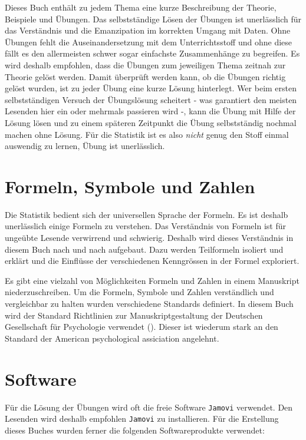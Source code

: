 \documentclass[
]{book}
\theoremstyle{definition}
\theoremstyle{definition}
\theoremstyle{definition}
\theoremstyle{definition}
\theoremstyle{remark}
\begin{document}
Dieses Buch enthält zu jedem Thema eine kurze Beschreibung der Theorie, Beispiele und Übungen. Das selbstständige Lösen der Übungen ist unerlässlich für das Verständnis und die Emanzipation im korrekten Umgang mit Daten. Ohne Übungen fehlt die Auseinandersetzung mit dem Unterrichtsstoff und ohne diese fällt es den allermeisten schwer sogar einfachste Zusammenhänge zu begreifen. Es wird deshalb empfohlen, dass die Übungen zum jeweiligen Thema zeitnah zur Theorie gelöst werden. Damit überprüft werden kann, ob die Übungen richtig gelöst wurden, ist zu jeder Übung eine kurze Lösung hinterlegt. Wer beim ersten selbstständigen Versuch der Übungslösung scheitert - was garantiert den meisten Lesenden hier ein oder mehrmals passieren wird -, kann die Übung mit Hilfe der Lösung lösen und zu einem späteren Zeitpunkt die Übung selbstständig nochmal machen ohne Lösung. Für die Statistik ist es also \emph{nicht} genug den Stoff einmal auswendig zu lernen, Übung ist unerlässlich.

\section{Formeln, Symbole und Zahlen}\label{formeln}

Die Statistik bedient sich der universellen Sprache der Formeln. Es ist deshalb unerlässlich einige Formeln zu verstehen. Das Verständnis von Formeln ist für ungeübte Lesende verwirrend und schwierig. Deshalb wird dieses Verständnis in diesem Buch nach und nach aufgebaut. Dazu werden Teilformeln isoliert und erklärt und die Einflüsse der verschiedenen Kenngrössen in der Formel exploriert.

Es gibt eine vielzahl von Möglichkeiten Formeln und Zahlen in einem Manuskript niederzuschreiben. Um die Formeln, Symbole und Zahlen verständlich und vergleichbar zu halten wurden verschiedene Standards definiert. In diesem Buch wird der Standard Richtlinien zur Manuskriptgestaltung der Deutschen Gesellschaft für Psychologie verwendet (). Dieser ist wiederum stark an den Standard der American psychological assiciation angelehnt.

\section{Software}\label{software}

Für die Lösung der Übungen wird oft die freie Software \texttt{Jamovi} verwendet. Den Lesenden wird deshalb empfohlen \texttt{Jamovi} zu installieren. Für die Erstellung dieses Buches wurden ferner die folgenden Softwareprodukte verwendet:
\end{document}
